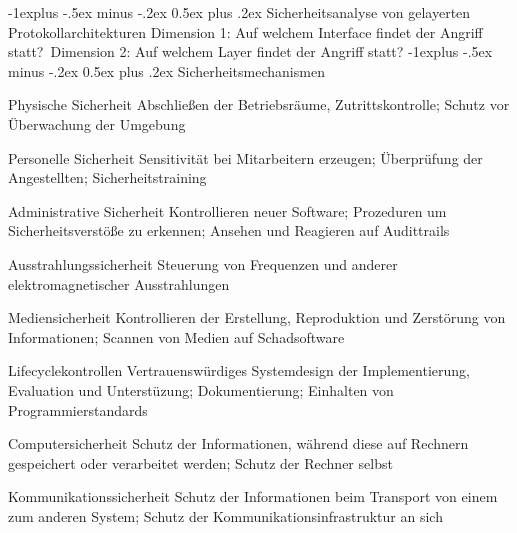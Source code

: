 \documentclass[10pt,landscape]{article}
\makeatletter
\renewcommand{\subsection}{\@startsection{subsection}{2}{0mm}%
                                {-1explus -.5ex minus -.2ex}%
                                {0.5ex plus .2ex}%
                                {\normalfont\normalsize\bfseries}}
\makeatother
\begin{document}
\begin{multicols}{3}
    \subsection{Sicherheitsanalyse von gelayerten Protokollarchitekturen}
    Dimension 1: Auf welchem Interface findet der Angriff statt?\
    Dimension 2: Auf welchem Layer findet der Angriff statt?
    \subsection{Sicherheitsmechanismen}
    \begin{description*}
        \item[Physische Sicherheit] Abschließen der Betriebsräume, Zutrittskontrolle; Schutz vor Überwachung der Umgebung
        \item[Personelle Sicherheit] Sensitivität bei Mitarbeitern erzeugen; Überprüfung der Angestellten; Sicherheitstraining
        \item[Administrative Sicherheit] Kontrollieren neuer Software; Prozeduren um Sicherheitsverstöße zu erkennen; Ansehen und Reagieren auf Audittrails
        \item[Ausstrahlungssicherheit] Steuerung von Frequenzen und anderer elektromagnetischer Ausstrahlungen
        \item[Mediensicherheit] Kontrollieren der Erstellung, Reproduktion und Zerstörung von Informationen; Scannen von Medien auf Schadsoftware
        \item[Lifecyclekontrollen] Vertrauenswürdiges Systemdesign der Implementierung, Evaluation und Unterstüzung; Dokumentierung; Einhalten von Programmierstandards
        \item[Computersicherheit] Schutz der Informationen, während diese auf Rechnern gespeichert oder verarbeitet werden; Schutz der Rechner selbst
        \item[Kommunikationssicherheit] Schutz der Informationen beim Transport von einem zum anderen System; Schutz der Kommunikationsinfrastruktur an sich
    \end{description*}

\end{multicols}
\end{document}

